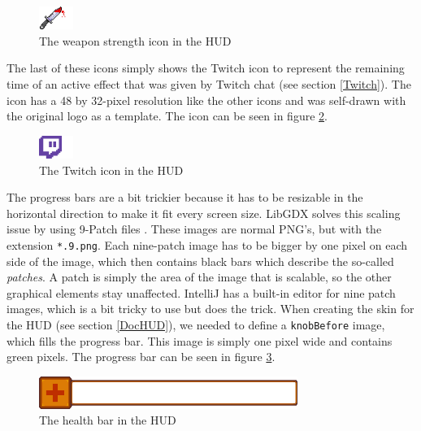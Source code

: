 \documentclass[12p]{article}
\begin{document}
\begin{figure}[ht]
  \center
  \includegraphics[width=0.1\textwidth]{Documentation/weapon_strength_icon.png}
  \caption{The weapon strength icon in the HUD}
  \label{fig:hud_weapon_strength_icon}
\end{figure}

The last of these icons simply shows the Twitch icon to represent the remaining time of an active effect that was given by Twitch chat (see section \ref{Twitch}). The icon has a 48 by 32-pixel resolution like the other icons and was self-drawn with the original logo as a template. The icon can be seen in figure \ref{fig:hud_twitch_icon}.

\begin{figure}[ht]
  \center
  \includegraphics[width=0.1\textwidth]{Documentation/twitch.png}
  \caption{The Twitch icon in the HUD}
  \label{fig:hud_twitch_icon}
\end{figure}

The progress bars are a bit trickier because it has to be resizable in the horizontal direction to make it fit every screen size. LibGDX solves this scaling issue by using 9-Patch files \cite{NinePatchImage}. These images are normal PNG's, but with the extension \texttt{*.9.png}. Each nine-patch image has to be bigger by one pixel on each side of the image, which then contains black bars which describe the so-called \emph{patches}. A patch is simply the area of the image that is scalable, so the other graphical elements stay unaffected. IntelliJ has a built-in editor for nine patch images, which is a bit tricky to use but does the trick. When creating the skin for the HUD (see section \ref{DocHUD}), we needed to define a \texttt{knobBefore} image, which fills the progress bar. This image is simply one pixel wide and contains green pixels. The progress bar can be seen in figure \ref{fig:hud_health_bar}.

\begin{figure}[ht]
  \center
  \includegraphics[width=0.75\textwidth]{Documentation/healthbar.png}
  \caption{The health bar in the HUD}
  \label{fig:hud_health_bar}
\end{figure}
\end{document}
